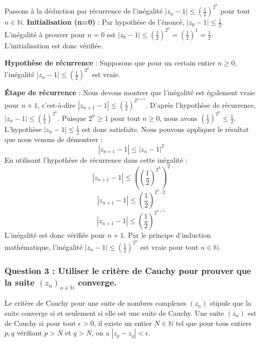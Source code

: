 \documentclass[a4paper,11pt]{report}
\begin{document}
Passons à la déduction par récurrence de l'inégalité $|z_n - 1| \le \left(\frac{1}{2}\right)^{2^n}$ pour tout $n \in \mathbb{N}$.
\textbf{Initialisation (n=0)} : Par hypothèse de l'énoncé, $|z_0 - 1| \le \frac{1}{2}$. L'inégalité à prouver pour $n=0$ est $|z_0 - 1| \le \left(\frac{1}{2}\right)^{2^0} = \left(\frac{1}{2}\right)^1 = \frac{1}{2}$. L'initialisation est donc vérifiée.

\textbf{Hypothèse de récurrence} : Supposons que pour un certain entier $n \ge 0$, l'inégalité $|z_n - 1| \le \left(\frac{1}{2}\right)^{2^n}$ est vraie.

\textbf{Étape de récurrence} : Nous devons montrer que l'inégalité est également vraie pour $n+1$, c'est-à-dire $|z_{n+1} - 1| \le \left(\frac{1}{2}\right)^{2^{n+1}}$.
D'après l'hypothèse de récurrence, $|z_n - 1| \le \left(\frac{1}{2}\right)^{2^n}$.
Puisque $2^n \ge 1$ pour tout $n \ge 0$, nous avons $\left(\frac{1}{2}\right)^{2^n} \le \frac{1}{2}$.
L'hypothèse $|z_n - 1| \le \frac{1}{2}$ est donc satisfaite. Nous pouvons appliquer le résultat que nous venons de démontrer :
$$|z_{n+1} - 1| \le |z_n - 1|^2$$
En utilisant l'hypothèse de récurrence dans cette inégalité :
$$|z_{n+1} - 1| \le \left(\left(\frac{1}{2}\right)^{2^n}\right)^2$$
$$|z_{n+1} - 1| \le \left(\frac{1}{2}\right)^{2^n \cdot 2}$$
$$|z_{n+1} - 1| \le \left(\frac{1}{2}\right)^{2^{n+1}}$$
L'inégalité est donc vérifiée pour $n+1$.
Par le principe d'induction mathématique, l'inégalité $|z_n - 1| \le \left(\frac{1}{2}\right)^{2^n}$ est vraie pour tout $n \in \mathbb{N}$.

\subsubsection*{Question 3 : Utiliser le critère de Cauchy pour prouver que la suite $(z_n)_{n \in \mathbb{N}}$ converge.}

Le critère de Cauchy pour une suite de nombres complexes $(z_n)$ stipule que la suite converge si et seulement si elle est une suite de Cauchy. Une suite $(z_n)$ est de Cauchy si pour tout $\epsilon > 0$, il existe un entier $N \in \mathbb{N}$ tel que pour tous entiers $p, q$ vérifiant $p > N$ et $q > N$, on a $|z_p - z_q| < \epsilon$.
\end{document}
